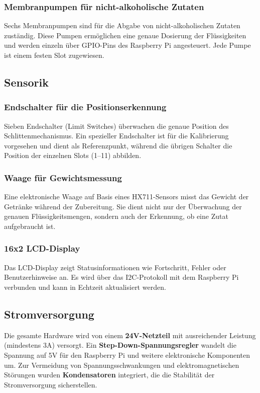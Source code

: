 \subsubsection{Membranpumpen für nicht-alkoholische Zutaten}
Sechs Membranpumpen sind für die Abgabe von nicht-alkoholischen Zutaten zuständig. Diese Pumpen ermöglichen eine genaue Dosierung der Flüssigkeiten und werden einzeln über GPIO-Pins des Raspberry Pi angesteuert. Jede Pumpe ist einem festen Slot zugewiesen.

\subsection{Sensorik}
\subsubsection{Endschalter für die Positionserkennung}
Sieben Endschalter (Limit Switches) überwachen die genaue Position des Schlittenmechanismus. Ein spezieller Endschalter ist für die Kalibrierung vorgesehen und dient als Referenzpunkt, während die übrigen Schalter die Position der einzelnen Slots (1--11) abbilden.

\subsubsection{Waage für Gewichtsmessung}
Eine elektronische Waage auf Basis eines HX711-Sensors misst das Gewicht der Getränke während der Zubereitung. Sie dient nicht nur der Überwachung der genauen Flüssigkeitsmengen, sondern auch der Erkennung, ob eine Zutat aufgebraucht ist.

\subsubsection{16x2 LCD-Display}
Das LCD-Display zeigt Statusinformationen wie Fortschritt, Fehler oder Benutzerhinweise an. Es wird über das I2C-Protokoll mit dem Raspberry Pi verbunden und kann in Echtzeit aktualisiert werden.

\subsection{Stromversorgung}
Die gesamte Hardware wird von einem \textbf{24V-Netzteil} mit ausreichender Leistung (mindestens 3A) versorgt. Ein \textbf{Step-Down-Spannungsregler} wandelt die Spannung auf 5V für den Raspberry Pi und weitere elektronische Komponenten um. Zur Vermeidung von Spannungsschwankungen und elektromagnetischen Störungen wurden \textbf{Kondensatoren} integriert, die die Stabilität der Stromversorgung sicherstellen.


